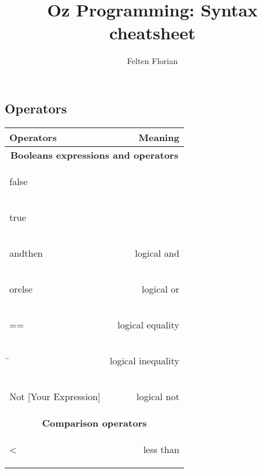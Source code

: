 \documentclass[12pt]{article}
\title{Oz Programming: Syntax cheatsheet}
\author{Felten Florian}
\begin{document}
\maketitle

\begin{multicols}{2}

\section{Operators}

\begin{tabular}{l r}
\toprule[0.2em]
\multicolumn{1}{l}{\textbf{Operators}} & \textbf{Meaning}\\
\midrule

\multicolumn{2}{c}{\textbf{Booleans expressions and operators}}\\
\begin{oz}
 false
\end{oz}
 &\\
 
\begin{oz}
 true
\end{oz}
 &\\
 
\begin{oz}
 andthen
\end{oz}
 &logical and \\
 
\begin{oz}
 orelse
\end{oz}
 &logical or\\
 
\begin{oz}
 ==
\end{oz}
 &logical equality\\
 
\begin{oz}
 \=
\end{oz}
 &logical inequality\\
 
\begin{oz}
 {Not [Your Expression]}
\end{oz}
 &logical not\\[0.4em]
 
 
\multicolumn{2}{c}{\textbf{Comparison operators}}\\

\begin{oz}
 <
\end{oz}
 &less than\\
 

\end{tabular}
\end{multicols}
\end{document}
